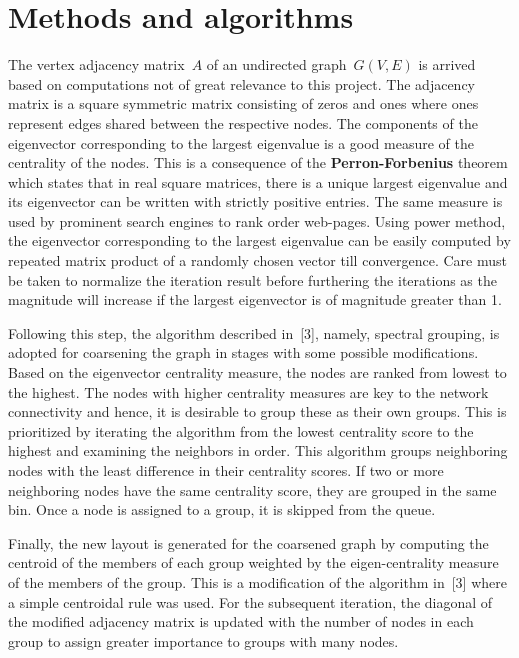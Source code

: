 \documentclass[11pt]{article}
\begin{document}
\section{Methods and algorithms}

The vertex adjacency matrix~$A$ of an undirected graph~$G(V,E)$ is arrived based on computations not of great relevance to this project. The adjacency matrix is a square symmetric matrix consisting of zeros and ones where ones represent edges shared between the respective nodes. The components of the eigenvector corresponding to the largest eigenvalue is a good measure of the centrality of the nodes. This is a consequence of the \textbf{Perron-Forbenius} theorem which states that in real square matrices, there is a unique largest eigenvalue and its eigenvector can be written with strictly positive entries. The same measure is used by prominent search engines to rank order web-pages. Using power method, the eigenvector corresponding to the largest eigenvalue can be easily computed by repeated matrix product of a randomly chosen vector till convergence. Care must be taken to normalize the iteration result before furthering the iterations as the magnitude will increase if the largest eigenvector is of magnitude greater than 1.

Following this step, the algorithm described in~[3], namely, spectral grouping, is adopted for coarsening the graph in stages with some possible modifications. Based on the eigenvector centrality measure, the nodes are ranked from lowest to the highest. The nodes with higher centrality measures are key to the network connectivity and hence, it is desirable to group these as their own groups. This is prioritized by iterating the algorithm from the lowest centrality score to the highest and examining the neighbors in order. This algorithm groups neighboring nodes with the least difference in their centrality scores. If two or more neighboring nodes have the same centrality score, they are grouped in the same bin. Once a node is assigned to a group, it is skipped from the queue.

Finally, the new layout is generated for the coarsened graph by computing the centroid of the members of each group weighted by the eigen-centrality measure of the members of the group. This is a modification of the algorithm in~[3] where a simple centroidal rule was used. For the subsequent iteration, the diagonal of the modified adjacency matrix is updated with the number of nodes in each group to assign greater importance to groups with many nodes.
\end{document}

